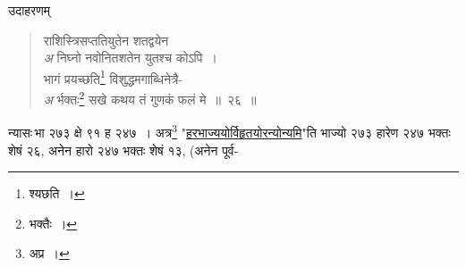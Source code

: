 \documentclass[11pt, openany]{book}
\begin{document}
उदाहरणम् \textendash 

\begin{quote}
{\color{red}राशिस्त्रिसप्ततियुतेन शतद्वयेन \\
\emph{\color{white}अ} \hspace{2mm} निघ्नो नवोनितशतेन युतश्च कोऽपि~। \\
भागं प्रयच्छति\renewcommand{\thefootnote}{१०}\footnote{श्यछति~।} विशुद्धमगाब्धिनेत्रै- \\
\emph{\color{white}अ} \hspace{2mm} र्भक्तः\renewcommand{\thefootnote}{११}\footnote{भक्तैः~।} सखे कथय तं गुणकं फलं मे~॥~२६~॥}
\end{quote}

न्यासः\textendash \,भा २७३ क्षे ९१ ह २४७~। अत्र\renewcommand{\thefootnote}{१२}\footnote{अप्र~।} "\hyperref[54]{हरभाज्ययोर्विहृतयोरन्योन्यमि}"ति भाज्यो २७३ हारेण २४७ भक्तः शेषं २६, अनेन हारो २४७ भक्तः शेषं १३, (अनेन पूर्व- 

\newpage
\end{document}
